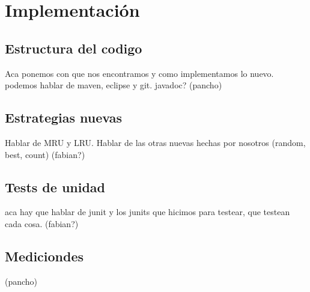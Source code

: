 \section{Implementaci\'on}

\subsection{Estructura del codigo}
Aca ponemos con que nos encontramos y como implementamos lo nuevo. 
podemos hablar de maven, eclipse y git. javadoc?
(pancho)

\subsection{Estrategias nuevas}
Hablar de MRU y LRU. Hablar de las otras nuevas hechas por nosotros (random, best, count) 
(fabian?)

\subsection{Tests de unidad}
aca hay que hablar de junit y los junits que hicimos para testear, que testean cada cosa.
(fabian?)

\subsection{Mediciondes}
(pancho)